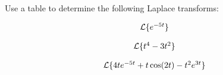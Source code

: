 

\begin{problem}
\item Use a table to determine the following Laplace transforms:

  \begin{subproblem}
  \item 
    \begin{eqnarray*}
      \laplace{e^{-5t}}
    \end{eqnarray*}
    \vfill

  \item 
    \begin{eqnarray*}
      \laplace{t^4-3t^2}
    \end{eqnarray*}
    \vfill
      
  \item 
    \begin{eqnarray*}
      \laplace{4te^{-5t} + t\cos(2t) - t^2e^{3t}}
    \end{eqnarray*}
    \vfill

  \end{subproblem}
\end{problem}

